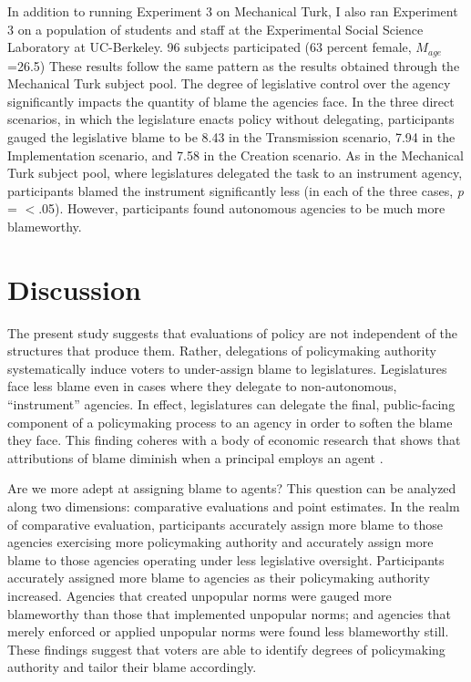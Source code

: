 \documentclass{article}
\begin{document}
In addition to running Experiment 3 on Mechanical Turk, I also ran Experiment 3 on a population of students and staff at the Experimental Social Science Laboratory at UC-Berkeley. 96 subjects participated (63 percent female, $M_{age}$=26.5) These results follow the same pattern as the results obtained through the Mechanical Turk subject pool. The degree of legislative control over the agency significantly impacts the quantity of blame the agencies face. In the three direct scenarios, in which the legislature enacts policy without delegating, participants gauged the legislative blame to be 8.43 in the Transmission scenario, 7.94 in the Implementation scenario, and 7.58 in the Creation scenario. As in the Mechanical Turk subject pool, where legislatures delegated the task to an instrument agency, participants blamed the instrument significantly less (in each of the three cases, \emph{p} = $<$.05). However, participants found autonomous agencies to be much more blameworthy. 

\section{Discussion} 

The present study suggests that evaluations of policy are not independent of the structures that produce them. Rather, delegations of policymaking authority systematically induce voters to under-assign blame to legislatures. Legislatures face less blame even in cases where they delegate to non-autonomous, ``instrument'' agencies. In effect, legislatures can delegate the final, public-facing component of a policymaking process to an agency in order to soften the blame they face. This finding coheres with a body of economic research that shows that attributions of blame diminish when a principal employs an agent \citep{Coffman2011}.

Are we more adept at assigning blame to agents? This question can be analyzed along two dimensions: comparative evaluations and point estimates. In the realm of comparative evaluation, participants accurately assign more blame to those agencies exercising more policymaking authority and accurately assign more blame to those agencies operating under less legislative oversight. Participants accurately assigned more blame to agencies as their policymaking authority increased. Agencies that created unpopular norms were gauged more blameworthy than those that implemented unpopular norms; and agencies that merely enforced or applied unpopular norms were found less blameworthy still. These findings suggest that voters are able to identify degrees of policymaking authority and tailor their blame accordingly. 
\end{document}
